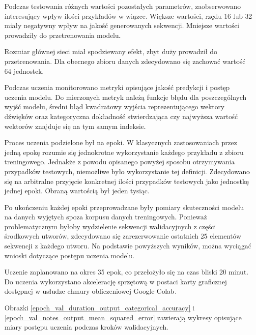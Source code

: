 {{        \bigskip

        Podczas testowania różnych wartości pozostałych parametrów, zaobserwowano interesujący wpływ ilości przykładów w\,\,wiązce.
        Większe wartości, rzędu 16 lub 32 miały negatywny wpływ na jakość generowanych sekwencji. 
        Mniejsze wartości prowadziły do przetrenowania modelu.

        Rozmiar głównej sieci miał spodziewany efekt, zbyt duży prowadził do przetrenowania. Dla obecnego
        zbioru danych zdecydowano się zachować wartość 64 jednostek.

        \bigskip

        Podczas uczenia monitorowano metryki opisujące jakość predykcji i\,\,postęp uczenia modelu.
        Do mierzonych metryk należą funkcje błędu dla poszczególnych wyjść modelu, średni błąd kwadratowy
        wyjścia reprezentującego wektory dźwięków oraz kategoryczna dokładność stwierdzająca czy najwyższa wartość
        wektorów znajduje się na tym samym indeksie.
        
        Proces uczenia podzielone był na epoki. W\,\,klasycznych zastosowaniach przez jedną epokę rozumie się jednokrotne
        wykorzystanie każdego przykładu z\,\,zbioru treningowego. Jednakże z\,\,powodu opisanego powyżej sposobu otrzymywania
        przypadków testowych, niemożliwe było wykorzystanie tej definicji. Zdecydowano się na arbitralne przyjęcie konkretnej 
        ilości przypadków testowych jako jednostkę jednej epoki. Obraną wartością był jeden tysiąc.

        Po ukończeniu każdej epoki przeprowadzane były pomiary skuteczności modelu na danych wyjętych spoza korpusu 
        danych treningowych. Ponieważ problematycznym byłoby wydzielenie sekwencji walidacyjnych z\,\,części środkowych
        utworów, zdecydowano się zarezerwowanie ostatnich 25 elementów sekwencji z\,\,każdego utworu.
        Na podstawie powyższych wyników, można wyciągać wnioski dotyczące postępu uczenia modelu.

        Uczenie zaplanowano na okres 35 epok, co przełożyło się na czas bliski 20 minut. Do uczenia wykorzystano
        akcelerację sprzętową w\,\,postaci karty graficznej dostępnej w\,\,usłudze chmury obliczeniowej Google Colab.

        Obrazki \ref{epoch_val_duration_output_categorical_accuracy} i\,\,\ref{epoch_val_notes_output_mean_squared_error} zawierają wykresy opisujące miary postępu uczenia podczas kroków walidacyjnych.

}}
